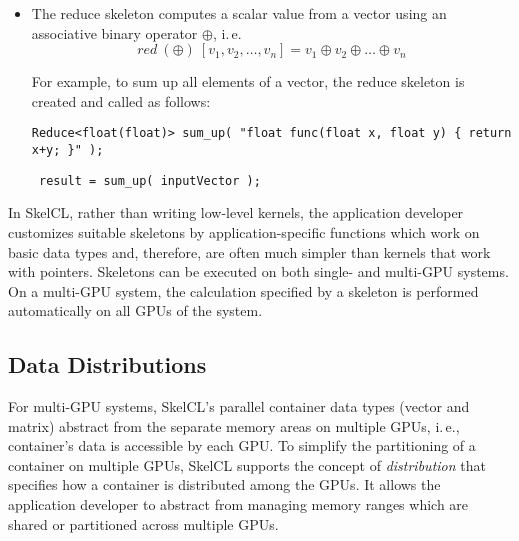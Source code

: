 \begin{itemize}
  \item The reduce skeleton computes a scalar value from a vector using an associative binary operator $\oplus$, i.\,e.
    \vspace{-.5em}
    \[ red\ (\oplus)\ [v_1, v_2, \dots, v_n] = v_1 \oplus v_2 \oplus \dots \oplus v_n \]

    \vspace{-.5em}
    For example, to sum up all elements of a vector, the reduce skeleton is created and called as follows:

    \vspace{.5em}
    \centerline{\lstinline!Reduce<float(float)> sum_up( "float func(float x, float y) { return x+y; }" );!}
    \vspace{.5em}
    \centerline{\lstinline! result = sum_up( inputVector );!}
    \vspace{.5em}

\end{itemize}

In SkelCL, rather than writing low-level kernels, the application developer customizes suitable skeletons by application-specific functions which work on basic data types and, therefore, are often much simpler than kernels that work with pointers.
Skeletons can be executed on both single- and multi-GPU systems.
On a multi-GPU system, the calculation specified by a skeleton is performed automatically on all GPUs of the system.


\subsection{Data Distributions}
\label{sec:data_distribution}
For multi-GPU systems, SkelCL's parallel container data types (vector and matrix) abstract from the separate memory areas on multiple GPUs, i.\,e., container's data is accessible by each GPU.
To simplify the partitioning of a container on multiple GPUs, SkelCL supports the concept of \emph{distribution} that specifies how a container is distributed among the GPUs.
It allows the application developer to abstract from managing memory ranges which are shared or partitioned across multiple GPUs.

